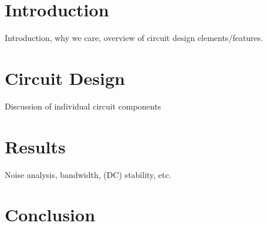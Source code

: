 \documentclass[aip,rsi,reprint,graphicx,draft]{revtex4-1} %
\begin{document}
\section{Introduction}
\label{Sec:Introduction}
Introduction, why we care, overview of circuit design elements/features.

\section{Circuit Design}
\label{Sec:Circuit}
Discussion of individual circuit components

\section{Results}
\label{Sec:Results}
Noise analysis, bandwidth, (DC) stability, etc.


\section{Conclusion}
\label{Sec:Conclusion}



%
%

%
\end{document}
